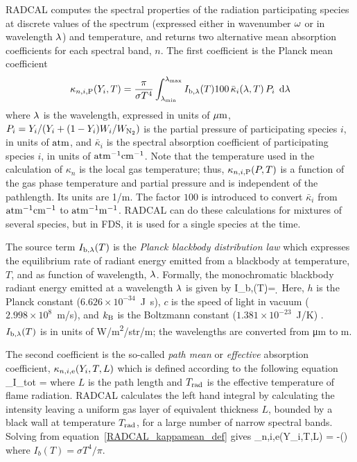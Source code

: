 RADCAL computes the spectral properties of the radiation participating species at discrete values of the spectrum (expressed either in wavenumber $\omega$ or in wavelength $\lambda$) and temperature,
and returns two alternative mean absorption coefficients for each spectral band, $n$. The first coefficient is the Planck mean coefficient \cite{Tien:1968}
\begin{equation}
\kappa_{n,i,{\rm P}}(Y_i,T) = \dfrac{\pi}{\sigma T^4}
\displaystyle\int_{\lambda_{\min}}^{\lambda_{\max}}{I_{\rm b,\lambda}(T)
100 \, \bar{\kappa}_i(\lambda,T) \, P_i \; \,\mathrm{d} \lambda}
\end{equation}
where $\lambda$ is the wavelength, expressed in units of ${\rm \mu m}$, $P_i=Y_i/(Y_i + (1-Y_i)W_i/W_{\rm N_2})$ is the partial pressure of participating species $i$, in units of ${\rm atm}$, and $\bar{\kappa}_i$ is the spectral absorption coefficient of participating species $i$, in units of ${\rm atm^{-1}cm^{-1}}$. Note that the temperature used in the calculation of $\kappa_n$ is the local gas temperature; thus, $\kappa_{n,i,{\rm P}}(P,T)$ is a function of the gas phase temperature and partial pressure and is independent of the pathlength. Its units are 1/m.
The factor $100$ is introduced to convert $\bar{\kappa}_i$ from ${\rm atm^{-1}cm^{-1}}$ to ${\rm atm^{-1}m^{-1}}$.
RADCAL can do these calculations for mixtures of several species, but in FDS, it is used for a single species at the time.

The source term $I_{\rm b,\lambda}(T)$ is the {\em Planck blackbody distribution law} which expresses the equilibrium rate of radiant energy emitted from a blackbody at temperature, $T$, and as function of wavelength, $\lambda$. Formally, the monochromatic blackbody radiant energy emitted at a wavelength $\lambda$ is given by \cite{Penner:1959}
\be \label{eq:Planck_law}
I_{\rm b,\la}(T)\d \la = \d \la
\ee
Here, $h$ is the Planck constant ($6.626 \times 10^{-34}$~\unit{J.s}), $c$ is the speed of light in vacuum ($2.998 \times 10^8$~m/s), and $k_{\rm B}$ is the Boltzmann constant ($1.381 \times 10^{-23}$~J/K) \cite{Mohr:2012}.
$I_{\rm b,\lambda}(T)$ is in units of \unit{W/m^2/str/m}; the wavelengths are converted from \unit{\micro m} to m.

The second coefficient is the so-called {\em path mean} or {\em effective} absorption coefficient, $\kappa_{n,i,{\rm e}}(Y_i,T,L)$ which is defined according to the following equation
\be
   _{I_{\rm tot}}
   = \frac{\sigma}{\pi}
    \label{RADCAL_kappamean_def}
\ee
where $L$ is the path length and $T_{\rm rad}$ is the effective temperature of flame radiation. RADCAL calculates the left hand integral by calculating the intensity leaving a uniform gas layer of equivalent thickness $L$, bounded by a black wall at temperature $T_{\rm rad}$, for a large number of narrow spectral bands. Solving from equation~\ref{RADCAL_kappamean_def} gives
\be
  \kappa_{n,i,{\rm e}}(Y_i,T,L) = -\ln\left(\right)
\ee
where $I_b(T) = \sigma T^4/\pi$.

